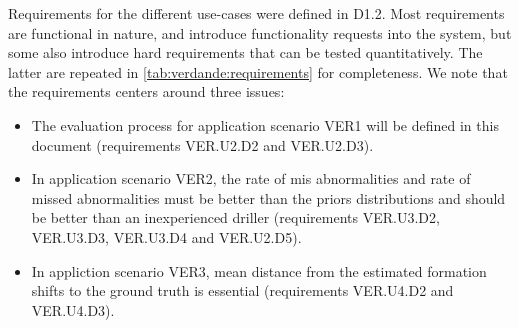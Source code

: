 \documentclass{article}
\theoremstyle{theorem}
\theoremstyle{definition}
\begin{document}
Requirements for the different use-cases were defined in D1.2. Most requirements are functional in nature, and introduce functionality requests into the system, but some also introduce hard requirements that can be tested quantitatively. The latter are repeated in \ref{tab:verdande:requirements} for completeness. We note that the requirements centers around three issues:
\begin{itemize}
\item The evaluation process for application scenario VER1 will be defined in this document (requirements VER.U2.D2 and VER.U2.D3).
\item In application scenario VER2, the rate of mis abnormalities and rate of missed abnormalities must be better than the priors distributions and should be better than an inexperienced driller (requirements VER.U3.D2, VER.U3.D3, VER.U3.D4 and VER.U2.D5).
\item In appliction scenario VER3, mean distance from the estimated formation shifts to the ground truth is essential (requirements VER.U4.D2 and VER.U4.D3).
\end{itemize}
\end{document}
